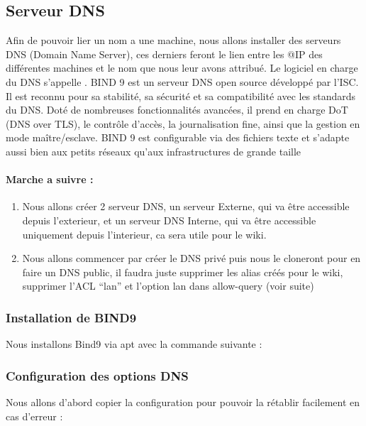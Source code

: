 \documentclass{article}
\begin{document}
\subsection{Serveur DNS}
Afin de pouvoir lier un nom a une machine, nous allons installer des serveurs DNS (Domain Name Server), ces derniers feront le lien entre les @IP des différentes machines et le nom que nous leur avons attribué. Le logiciel en charge du DNS s'appelle . BIND 9 est un serveur DNS open source développé par l’ISC. Il est reconnu pour sa stabilité, sa sécurité et sa compatibilité avec les standards du DNS. Doté de nombreuses fonctionnalités avancées, il prend en charge DoT (DNS over TLS), le contrôle d’accès, la journalisation fine, ainsi que la gestion en mode maître/esclave. BIND 9 est configurable via des fichiers texte et s’adapte aussi bien aux petits réseaux qu’aux infrastructures de grande taille

\paragraph{Marche a suivre :}
\begin{enumerate}
	\item Nous allons créer 2 serveur DNS, un serveur Externe, qui va être accessible depuis l’exterieur, et un serveur DNS Interne, qui va être accessible uniquement depuis l’interieur, ca sera utile pour le wiki. 
	\item Nous allons commencer par créer le DNS privé puis nous le cloneront pour en faire un DNS public, il faudra juste supprimer les alias créés pour le wiki, supprimer l’ACL “lan” et l’option lan dans allow-query (voir suite)
\end{enumerate}

\subsubsection{Installation de BIND9}
Nous installons Bind9 via apt avec la commande suivante :

\subsubsection{Configuration des options DNS}
Nous allons d'abord copier la configuration pour pouvoir la rétablir facilement en cas d'erreur :
\end{document}
